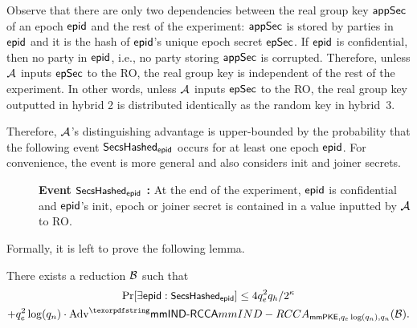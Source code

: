 Observe that there are only two dependencies between the real group key ${\mathsf{appSec}}$ of an epoch ${\normalfont\textsf{epid}}$ and the rest of the experiment: ${\mathsf{appSec}}$ is stored by parties in ${\normalfont\textsf{epid}}$ and it is the hash of ${\normalfont\textsf{epid}}$'s unique epoch secret ${\mathsf{epSec}}$. If ${\normalfont\textsf{epid}}$ is confidential, then no party in ${\normalfont\textsf{epid}}$, i.e., no party storing ${\mathsf{appSec}}$ is corrupted. Therefore, unless $\mathcal{A}_{\relax}$ inputs ${\mathsf{epSec}}$ to the RO, the real group key is independent of the rest of the experiment. In other words, unless $\mathcal{A}_{\relax}$ inputs ${\mathsf{epSec}}$ to the RO, the real group key outputted in hybrid 2 is distributed identically as the random key in hybrid~3.

\newcommand{\secsHash}{\variable{\small SecsHashed}}
\newcommand{\breaksRcca}{\variable{\small BreaksRCCA}}
\newcommand{\initHash}{\variable{\small InitHashed}}
\newcommand{\commitHash}{\variable{\small CommHashed}}
\newcommand{\joinerHash}{\variable{\small JoinHashed}}

Therefore, $\mathcal{A}_{\relax}$'s distinguishing advantage is upper-bounded by the probability that the following event $\textnormal{\textsf{SecsHashed}}_{\normalfont\textsf{epid}}$ occurs for at least one epoch ${\normalfont\textsf{epid}}$. For convenience, the event is more general and also considers init and joiner secrets.
\begin{description}
  \item[] {\bf Event $\secsHash_\hgnodeid$ : } At the end of the experiment, ${\normalfont\textsf{epid}}$ is confidential and ${\normalfont\textsf{epid}}$'s init, epoch or joiner secret is contained in a value inputted by $\mathcal{A}_{\relax}$ to RO.
\end{description}
Formally, it is left to prove the following lemma.
\begin{lemma}
  There exists a reduction $\mathcal{B}_{\relax}$ such that
  \begin{multline*}
    \Pr[\exists \hgnodeid : \secsHash_\hgnodeid] \leq 4q_e^2q_h/2^\kappa \\ + q_e^2\log(q_n)\cdot\textnormal{Adv}^\mmindrcca_{\mmPKE,q_e\log(q_n),q_n}(\Bdv).
  \end{multline*}
\label{thm:hybrid2-1}\end{lemma}

